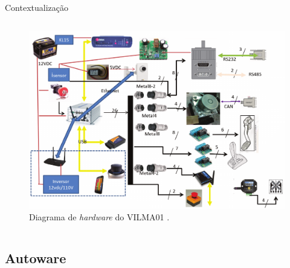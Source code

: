 \documentclass{if-beamer}
\begin{document}
\begin{frame}{Contextualização}
\begin{columns}
\begin{column}{0.6\textwidth}
		\begin{figure}[H]
			\centering
			\includegraphics[width=1\linewidth]{img/diagrama_vilma}
			\caption{Diagrama de \textit{hardware} do VILMA01 \cite{bedoya_alise_2016}.}
			\label{fig:diagrama_vilma}
		\end{figure}
		
		\end{column}
		
	\end{columns}
	
	
	
\end{frame}

\subsection*{Autoware}
\end{document}
